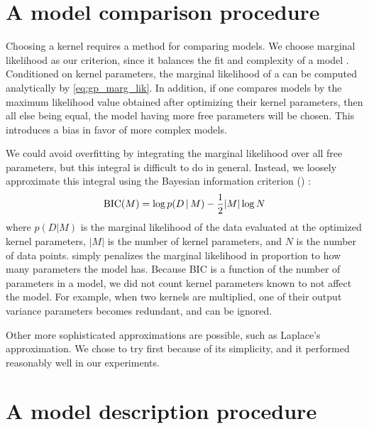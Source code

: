 \section{A model comparison procedure}

Choosing a kernel requires a method for comparing models.
We choose marginal likelihood as our criterion, since it balances the fit and complexity of a model \citep{rasmussen2001occam}.
Conditioned on kernel parameters, the marginal likelihood of a \gp{} can be computed analytically by \cref{eq:gp_marg_lik}.
In addition, if one compares \gp{} models by the maximum likelihood value obtained after optimizing their kernel parameters, then all else being equal, the model having more free parameters will be chosen.
This introduces a bias in favor of more complex models.

We could avoid overfitting by integrating the marginal likelihood over all free parameters, but this integral is difficult to do in general.
Instead, we loosely approximate this integral using the Bayesian information criterion (\BIC{}) \citep{schwarz1978estimating}:
%
\begin{equation}
\textrm{BIC}(M) = \log p(D \,|\, M) - \frac{1}{2} |M| \log N
\end{equation}
%
where $p(D|M)$ is the marginal likelihood of the data evaluated at the optimized kernel parameters, $|M|$ is the number of kernel parameters, and $N$ is the number of data points.
\BIC{} simply penalizes the marginal likelihood in proportion to how many parameters the model has.
Because BIC is a function of the number of parameters in a model, we did not count kernel parameters known to not affect the model.
For example, when two kernels are multiplied, one of their output variance parameters becomes redundant, and can be ignored.

Other more sophisticated approximations are possible, such as Laplace's approximation.
We chose to try \BIC{} first because of its simplicity, and it performed reasonably well in our experiments.




\section{A model description procedure}

